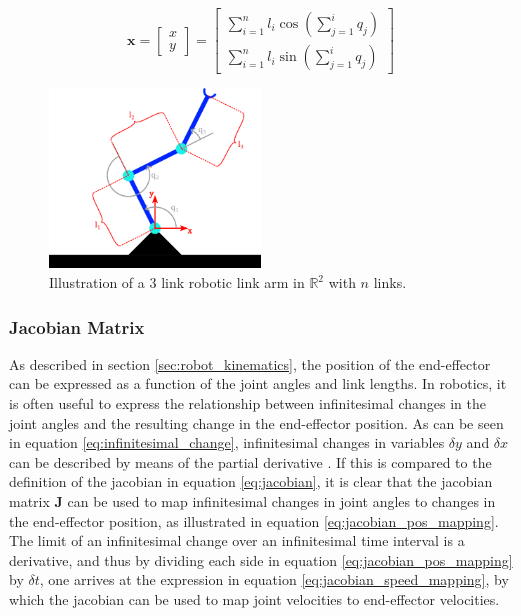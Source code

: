 \begin{equation}
    \label{eq:robot_kinematics}
    \mathbf{x} = \begin{bmatrix}
        x \\
        y
    \end{bmatrix} = \begin{bmatrix}
        \sum_{i=1}^{n} l_i \cos\left(\sum_{j=1}^{i} q_j\right) \\
        \sum_{i=1}^{n} l_i \sin\left(\sum_{j=1}^{i} q_j\right)
    \end{bmatrix}
\end{equation}

\begin{figure}[H]
    \centering
    \includegraphics[width=0.5\textwidth]{Images/manipulator_inkscape_Layer 1.png}
    \caption{Illustration of a 3 link robotic link arm in $\mathbb{R}^2$ with $n$ links.}
    \label{fig:robotic_link_arm}
\end{figure}


    \subsubsection{Jacobian Matrix}

As described in section \ref{sec:robot_kinematics}, the position of the end-effector can be expressed as a function of the joint angles and link lengths. In robotics, it is often useful to express the relationship between infinitesimal changes in the joint angles and the resulting change in the end-effector position. As can be seen in equation \ref{eq:infinitesimal_change}, infinitesimal changes in variables $\delta y$ and $\delta x$ can be described by means of the partial derivative \cite{modsim}. If this is compared to the definition of the jacobian in equation \ref{eq:jacobian}, it is clear that the jacobian matrix $\mathbf{J}$ can be used to map infinitesimal changes in joint angles to changes in the end-effector position, as illustrated in equation \ref{eq:jacobian_pos_mapping}. The limit of an infinitesimal change over an infinitesimal time interval is a derivative, and thus by dividing each side in equation \ref{eq:jacobian_pos_mapping} by $\delta t$, one arrives at the expression in equation \ref{eq:jacobian_speed_mapping}, by which the jacobian can be used to map joint velocities to end-effector velocities.

